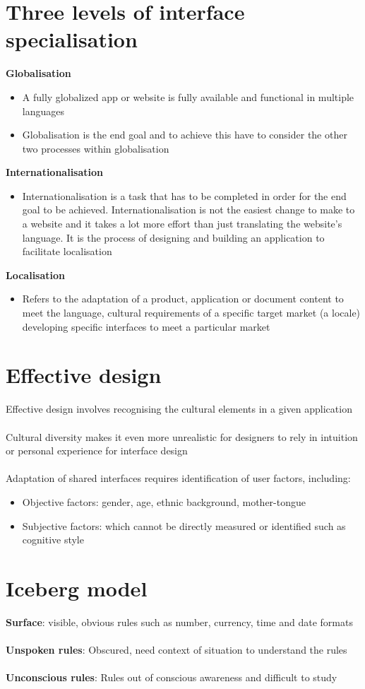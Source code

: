 \documentclass{article}[18pt]
\begin{document}
\section{Three levels of interface specialisation}
\textbf{Globalisation}
\begin{itemize}
	\item A fully globalized app or website is fully available and functional in multiple languages
	\item Globalisation is the end goal and to achieve this have to consider the other two processes within globalisation
\end{itemize}
\textbf{Internationalisation}
\begin{itemize}
	\item Internationalisation is a task that has to be completed in order for the end goal to be achieved. Internationalisation is not the easiest change to make to a website and it takes a lot more effort than just translating the website's language. It is the process of designing and building an application to facilitate localisation
\end{itemize}
\textbf{Localisation}
\begin{itemize}
	\item Refers to the adaptation of a product, application or document content to meet the language, cultural requirements of a specific target market (a locale) developing specific interfaces to meet a particular market
\end{itemize}
\section{Effective design}
Effective design involves recognising the cultural elements in a given application\\
\\
Cultural diversity makes it even more unrealistic for designers to rely in intuition or personal experience for interface design\\
\\
Adaptation of shared interfaces requires identification of user factors, including:
\begin{itemize}
	\item Objective factors: gender, age, ethnic background, mother-tongue
	\item Subjective factors: which cannot be directly measured or identified such as cognitive style
\end{itemize}
\section{Iceberg model}
\textbf{Surface}: visible, obvious rules such as number, currency, time and date formats\\
\\
\textbf{Unspoken rules}: Obscured, need context of situation to understand the rules\\
\\
\textbf{Unconscious rules}: Rules out of conscious awareness and difficult to study
\end{document}
